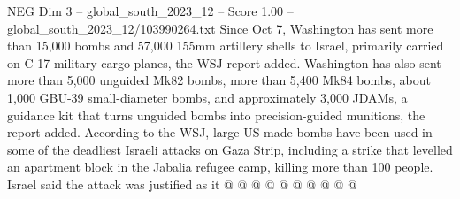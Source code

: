 \begin{textsample}{NEG Dim 3 – global\_south\_2023\_12 – Score 1.00 – global\_south\_2023\_12/103990264.txt}
Since Oct 7, Washington has sent more than 15,000 bombs and 57,000 155mm artillery shells to Israel, primarily carried on C-17 military cargo planes, the WSJ report added.
Washington has also sent more than 5,000 unguided Mk82 bombs, more than 5,400 Mk84 bombs, about 1,000 GBU-39 small-diameter bombs, and approximately 3,000 JDAMs, a guidance kit that turns unguided bombs into precision-guided munitions, the report added.
According to the WSJ, large US-made bombs have been used in some of the deadliest Israeli attacks on Gaza Strip, including a strike that levelled an apartment block in the Jabalia refugee camp, killing more than 100 people.
Israel said the attack was justified as it @ @ @ @ @ @ @ @ @ @

\end{textsample}
